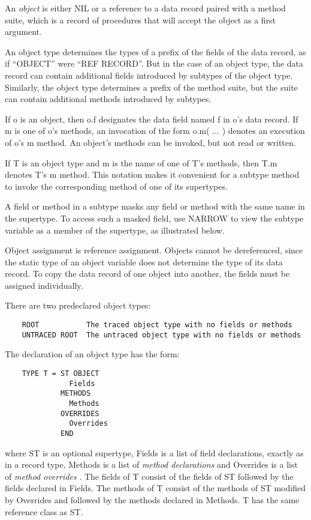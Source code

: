 \documentclass[10pt]{article}
\begin{document}
  An \emph{object}
 is either NIL or a reference to a data record paired with a method suite, which is a record of procedures that will accept the object as a first argument. 


  An object type determines the types of a prefix of the fields of the data record, as if ``OBJECT'' were ``REF RECORD''. But in the case of an object type, the data record can contain additional fields introduced by subtypes of the object type. Similarly, the object type determines a prefix of the method suite, but the suite can contain additional methods introduced by subtypes. 


 If o is an object, then o.f designates the data field named f in o's data record. If m is one of o's methods, an invocation of the form o.m( ... ) denotes an execution of o's m method. An object's methods can be invoked, but not read or written. 


  If T is an object type and m is the name of one of  T's methods, then T.m denotes T's m method. This notation makes it convenient for a subtype method to invoke the corresponding method of one of its supertypes. 


 A field or method in a subtype masks any field or method with the same name in the supertype. To access such a masked field, use NARROW to view the subtype variable as a member of the supertype, as illustrated below. 


  Object assignment is reference assignment. Objects cannot be dereferenced, since the static type of an object variable does not determine the type of its data record. To copy the data record of one object into another, the fields must be assigned individually. 


 There are two predeclared object types: 
\begin{verbatim}
    ROOT           The traced object type with no fields or methods
    UNTRACED ROOT  The untraced object type with no fields or methods
\end{verbatim}



 The declaration of an object type has the form: 
\begin{verbatim}
    TYPE T = ST OBJECT
               Fields
             METHODS
               Methods
             OVERRIDES
               Overrides
             END
\end{verbatim}
 where ST is an optional supertype, Fields is a list of field declarations, exactly as in a record type, Methods is a list of \emph{method declarations}
 and Overrides is a list of \emph{method overrides}
. The fields of T consist of the fields of ST followed by the fields declared in Fields. The methods of T consist of the methods of ST modified by Overrides and followed by the methods declared in Methods. T has the same reference class as ST. 
\end{document}
